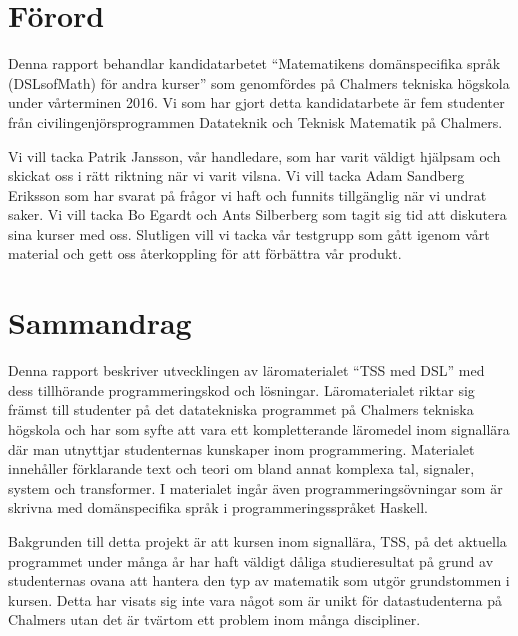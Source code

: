 \documentclass[12pt,a4paper,twoside,openright]{article}
\date{\today}
\begin{document}



\setlength{\parskip}{2mm}
\setlength{\parindent}{0pt}

\section*{Förord}
Denna rapport behandlar kandidatarbetet ``Matematikens domänspecifika språk
(DSLsofMath) för andra kurser'' som genomfördes på Chalmers tekniska högskola
 under vårterminen 2016. Vi som har gjort detta kandidatarbete är fem studenter
från civilingenjörsprogrammen Datateknik och Teknisk Matematik på Chalmers.

Vi vill tacka Patrik Jansson, vår handledare, som har varit väldigt hjälpsam
och skickat oss i rätt riktning när vi varit vilsna. Vi vill tacka Adam Sandberg Eriksson
som har svarat på frågor vi haft och funnits tillgänglig när vi undrat saker. Vi
vill tacka Bo Egardt och Ants Silberberg som tagit sig tid att diskutera sina
kurser med oss. Slutligen vill vi tacka vår testgrupp som gått igenom vårt
material och gett oss återkoppling för att förbättra vår produkt.

\newpage

\thispagestyle{plain}

\section*{Sammandrag}
Denna rapport beskriver utvecklingen av läromaterialet ``TSS med DSL'' med dess
tillhörande programmeringskod och lösningar. Läromaterialet riktar sig främst
till studenter på det datatekniska programmet på Chalmers tekniska högskola och har som syfte att
vara ett kompletterande läromedel inom signallära där man utnyttjar studenternas
kunskaper inom programmering. Materialet innehåller förklarande text och teori
om bland annat komplexa tal, signaler, system och transformer. I materialet
ingår även programmeringsövningar som är skrivna med domänspecifika språk i
programmeringsspråket \gls{Haskell}.

Bakgrunden till detta projekt är att kursen inom signallära, TSS, på det
aktuella programmet under många år har haft väldigt dåliga studieresultat på
grund av studenternas ovana att hantera den typ av matematik som utgör
grundstommen i kursen. Detta har visats sig inte vara något som är unikt
för datastudenterna på Chalmers utan det är tvärtom ett problem inom många
discipliner.
\end{document}
